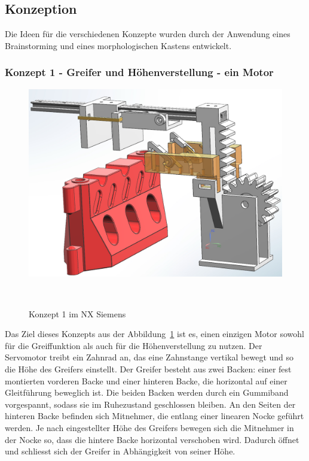 \documentclass[main.tex]{subfiles} %
\begin{document}
\newpage

\subsection*{Konzeption}

Die Ideen für die verschiedenen Konzepte wurden durch der Anwendung eines Brainstorming und eines morphologischen Kastens entwickelt.

\subsubsection*{Konzept 1 - Greifer und Höhenverstellung - ein Motor}

\begin{figure}[H]
    \centering
    \includegraphics[width=1\textwidth]{Konzept_1_Ein_Motor.png}
    \caption{Konzept 1 im NX Siemens}~\label{fig:Konzept_1}
\end{figure}

Das Ziel dieses Konzepts aus der Abbildung~\ref{fig:Konzept_1} ist es, einen einzigen Motor sowohl für die Greiffunktion als auch für die Höhenverstellung zu nutzen. 
Der Servomotor treibt ein Zahnrad an, das eine Zahnstange vertikal bewegt und so die Höhe des Greifers einstellt.
Der Greifer besteht aus zwei Backen: einer fest montierten vorderen Backe und einer hinteren Backe, die horizontal auf einer 
Gleitführung beweglich ist. Die beiden Backen werden durch ein Gummiband vorgespannt, sodass sie im Ruhezustand geschlossen bleiben.
An den Seiten der hinteren Backe befinden sich Mitnehmer, die entlang einer linearen Nocke geführt werden. Je nach eingestellter 
Höhe des Greifers bewegen sich die Mitnehmer in der Nocke so, dass die hintere Backe horizontal verschoben wird. Dadurch öffnet 
und schliesst sich der Greifer in Abhängigkeit von seiner Höhe.
\end{document}
